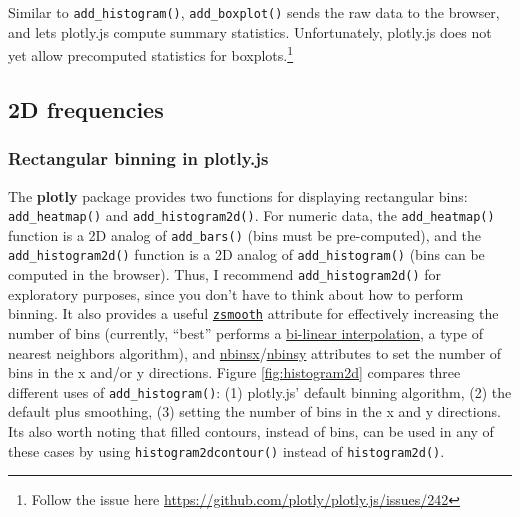 \documentclass[12pt,]{isuthesis}
\let\rmarkdownfootnote\footnote%
\def\footnote{\protect\rmarkdownfootnote}
\begin{document}
Similar to \texttt{add\_histogram()}, \texttt{add\_boxplot()} sends the
raw data to the browser, and lets plotly.js compute summary statistics.
Unfortunately, plotly.js does not yet allow precomputed statistics for
boxplots.\footnote{Follow the issue here
  \url{https://github.com/plotly/plotly.js/issues/242}}

\subsection{2D frequencies}\label{d-frequencies}

\subsubsection{Rectangular binning in
plotly.js}\label{rectangular-binning-in-plotly.js}

The \textbf{plotly} package provides two functions for displaying
rectangular bins: \texttt{add\_heatmap()} and
\texttt{add\_histogram2d()}. For numeric data, the
\texttt{add\_heatmap()} function is a 2D analog of \texttt{add\_bars()}
(bins must be pre-computed), and the \texttt{add\_histogram2d()}
function is a 2D analog of \texttt{add\_histogram()} (bins can be
computed in the browser). Thus, I recommend \texttt{add\_histogram2d()}
for exploratory purposes, since you don't have to think about how to
perform binning. It also provides a useful
\href{https://plot.ly/r/reference/\#histogram2d-zsmooth}{\texttt{zsmooth}}
attribute for effectively increasing the number of bins (currently,
``best'' performs a
\href{https://en.wikipedia.org/wiki/Bilinear_interpolation}{bi-linear
interpolation}, a type of nearest neighbors algorithm), and
\href{https://plot.ly/r/reference/\#histogram2d-nbinsx}{nbinsx}/\href{https://plot.ly/r/reference/\#histogram2d-nbinsy}{nbinsy}
attributes to set the number of bins in the x and/or y directions.
Figure \ref{fig:histogram2d} compares three different uses of
\texttt{add\_histogram()}: (1) plotly.js' default binning algorithm, (2)
the default plus smoothing, (3) setting the number of bins in the x and
y directions. Its also worth noting that filled contours, instead of
bins, can be used in any of these cases by using
\texttt{histogram2dcontour()} instead of \texttt{histogram2d()}.
\end{document}

